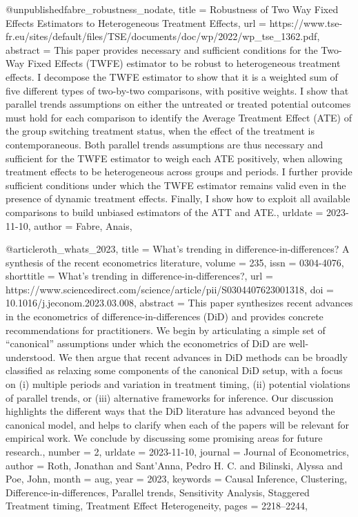 @unpublished{fabre_robustness_nodate,
	title = {Robustness of {Two} {Way} {Fixed} {Effects} {Estimators} to {Heterogeneous} {Treatment} {Effects}},
	url = {https://www.tse-fr.eu/sites/default/files/TSE/documents/doc/wp/2022/wp_tse_1362.pdf},
	abstract = {This paper provides necessary and sufficient conditions for the Two-Way Fixed Effects (TWFE) estimator to be robust to heterogeneous treatment effects. I decompose the TWFE estimator to show that it is a weighted sum of five different types of two-by-two comparisons, with positive weights. I show that parallel trends assumptions on either the untreated or treated potential outcomes must hold for each comparison to identify the Average Treatment Effect (ATE) of the group switching treatment status, when the effect of the treatment is contemporaneous. Both parallel trends assumptions are thus necessary and sufficient for the TWFE estimator to weigh each ATE positively, when allowing treatment effects to be heterogeneous across groups and periods. I further provide sufficient conditions under which the TWFE estimator remains valid even in the presence of dynamic treatment effects. Finally, I show how to exploit all available comparisons to build unbiased estimators of the ATT and ATE.},
	urldate = {2023-11-10},
	author = {Fabre, Anais},
}

@article{roth_whats_2023,
	title = {What’s trending in difference-in-differences? {A} synthesis of the recent econometrics literature},
	volume = {235},
	issn = {0304-4076},
	shorttitle = {What’s trending in difference-in-differences?},
	url = {https://www.sciencedirect.com/science/article/pii/S0304407623001318},
	doi = {10.1016/j.jeconom.2023.03.008},
	abstract = {This paper synthesizes recent advances in the econometrics of difference-in-differences (DiD) and provides concrete recommendations for practitioners. We begin by articulating a simple set of “canonical” assumptions under which the econometrics of DiD are well-understood. We then argue that recent advances in DiD methods can be broadly classified as relaxing some components of the canonical DiD setup, with a focus on (i) multiple periods and variation in treatment timing, (ii) potential violations of parallel trends, or (iii) alternative frameworks for inference. Our discussion highlights the different ways that the DiD literature has advanced beyond the canonical model, and helps to clarify when each of the papers will be relevant for empirical work. We conclude by discussing some promising areas for future research.},
	number = {2},
	urldate = {2023-11-10},
	journal = {Journal of Econometrics},
	author = {Roth, Jonathan and Sant’Anna, Pedro H. C. and Bilinski, Alyssa and Poe, John},
	month = aug,
	year = {2023},
	keywords = {Causal Inference, Clustering, Difference-in-differences, Parallel trends, Sensitivity Analysis, Staggered Treatment timing, Treatment Effect Heterogeneity},
	pages = {2218--2244},
}

